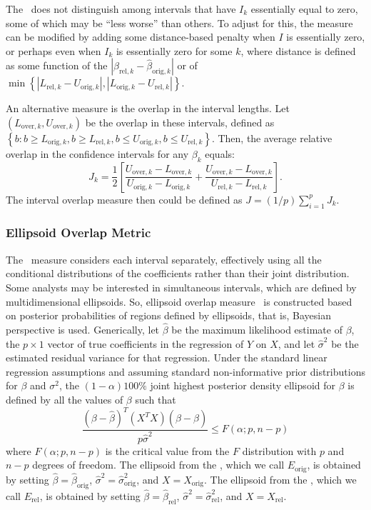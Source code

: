 The \IO\ does not distinguish among intervals that have $I_k$
essentially equal to zero, some of which may be ``less worse''
than others. To adjust for this, the measure can be modified by
adding some distance-based penalty when $I$ is essentially zero,
or perhaps even when $I_k$ is essentially zero for some $k$, where
distance is defined as some function of the
$|\hat{\beta}_{\mathrm{rel},k} - \hat{\beta}_{\mathrm{orig},k}|$
or of $\min\left\{|L_{\mathrm{rel},k} - U_{\mathrm{orig},k}|,
|L_{\mathrm{orig},k} - U_{\mathrm{rel},k}|\right\}$.

An alternative measure is the overlap in the interval lengths. Let
$(L_{\mathrm{over},k}, U_{\mathrm{over},k})$ be the overlap in
these intervals, defined as $\left\{b: b \geq L_{\mathrm{orig},k},
b \geq L_{\mathrm{rel},k},  b \leq U_{\mathrm{orig},k},  b \leq
U_{\mathrm{rel},k}\right\}$. Then, the average relative overlap in
the confidence intervals for any $\beta_{k}$ equals:
\begin{equation}
J_k = \frac{1}{2} \left[\frac{U_{\mathrm{over},k} -
L_{\mathrm{over},k}}{U_{\mathrm{orig},k} - L_{\mathrm{orig},k}} +
\frac{U_{\mathrm{over},k} -
L_{\mathrm{over},k}}{U_{\mathrm{rel},k} -
L_{\mathrm{rel},k}}\right].
\end{equation}
The interval overlap measure then could be defined as $J = (1/p)
\sum_{i=1}^p J_k$.

\subsubsection{Ellipsoid Overlap Metric}\label{subsec.overlap}
The \IO\ measure considers each interval separately, effectively using all
the conditional distributions of the coefficients rather than
their joint distribution. Some analysts may be interested in
simultaneous intervals, which are defined by multidimensional
ellipsoids.  So, ellipsoid overlap measure \EO\ is constructed 
based on  posterior probabilities of regions defined by ellipsoids, that is, 
Bayesian perspective is used.  Generically, let $\hat{\beta}$ be the
maximum likelihood estimate of $\beta$, the $p \times 1$ vector of
true coefficients in the regression of $Y$ on $X$, and let
$\hat{\sigma}^2$ be the estimated residual variance for that
regression. Under the standard linear regression assumptions and
assuming standard non-informative prior distributions for $\beta$
and $\sigma^2$, the $(1-\alpha)100\%$ joint highest posterior
density ellipsoid for $\beta$ is defined by all the values of
$\beta$ such that
\begin{displaymath}\label{eq_1}
\frac{(\beta
-\hat{\beta})^T(X^{T}X)(\beta-\hat{\beta})}{p\hat{\sigma}^2} \leq
F(\alpha;p, n-p)
\end{displaymath}
where $F(\alpha;p, n-p)$ is the critical value from the $F$
distribution with $p$ and $n-p$ degrees of freedom.  The ellipsoid
from the \DBORIG, which we call $E_{\mathrm{orig}}$, is obtained
by setting $\hat{\beta} = \hat{\beta}_{\mathrm{orig}}$,
$\hat{\sigma}^2 = \hat{\sigma}^2_{\mathrm{orig}}$, and $X =
X_{\mathrm{orig}}$. The ellipsoid from the \DBREL, which we call
$E_{\mathrm{rel}}$, is obtained by setting $\hat{\beta} =
\hat{\beta}_{\mathrm{rel}}$, $\hat{\sigma}^2 =
\hat{\sigma}^2_{\mathrm{rel}}$, and $X = X_{\mathrm{rel}}$.

